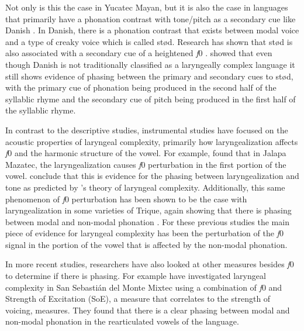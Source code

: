 Not only is this the case in Yucatec Mayan, but it is also the case in languages that primarily have a phonation contrast with tone/pitch as a secondary cue like Danish \citep{fischer-jorgensenPhoneticAnalysisStod1989,gronnumDanishStodLaryngealization2013,penaStodTimingDomain2022,penaProductionPerceptionStod2024}. In Danish, there is a phonation contrast that exists between modal voice and a type of creaky voice which is called stød. Research has shown that stød is also associated with a secondary cue of a heightened \textit{f}0 \citep{fischer-jorgensenPhoneticAnalysisStod1989,gronnumDanishStodLaryngealization2013}. \citet{penaStodTimingDomain2022,penaProductionPerceptionStod2024} showed that even though Danish is not traditionally classified as a laryngeally complex language it still shows evidence of phasing between the primary and secondary cues to stød, with the primary cue of phonation being produced in the second half of the syllablic rhyme and the secondary cue of pitch being produced in the first half of the syllablic rhyme.

In contrast to the descriptive studies, instrumental studies have focused on the acoustic properties of laryngeal complexity, primarily how laryngealization affects \textit{f}0 and the harmonic structure of the vowel. For example, \citet{garellekAcousticConsequencesPhonation2011} found that in Jalapa Mazatec, the laryngealization causes \textit{f}0 perturbation in the first portion of the vowel. \citeauthor{garellekAcousticConsequencesPhonation2011} conclude that this is evidence for the phasing between laryngealization and tone as predicted by \citeauthor{silvermanLaryngealComplexityOtomanguean1997}'s \citeyear{silvermanLaryngealComplexityOtomanguean1997} theory of laryngeal complexity. Additionally, this same phenomenon of \textit{f}0 perturbation has been shown to be the case with laryngealization in some varieties of Trique, again showing that there is phasing between modal and non-modal phonation \citep{dicanioCoarticulationToneGlottal2012}. For these previous studies the main piece of evidence for laryngeal complexity has been the perturbation of the \textit{f}0 signal in the portion of the vowel that is affected by the non-modal phonation.

In more recent studies, researchers have also looked at other measures besides \textit{f}0 to determine if there is phasing. For example \citet{wellerInteractionsToneGlottalization2023,wellerLexicalToneVowel2023,wellerVoiceQualityTone2024} have investigated laryngeal complexity in San Sebastián del Monte Mixtec using a combination of \textit{f}0 and Strength of Excitation (SoE), a measure that correlates to the strength of voicing, measures. They found that there is a clear phasing between modal and non-modal phonation in the rearticulated vowels of the language. 

